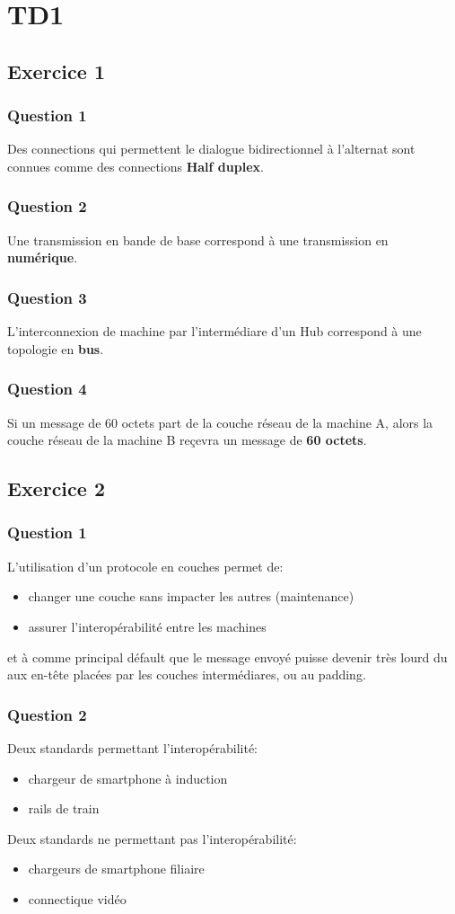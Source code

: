 \section{TD1}

\subsection{Exercice 1}
\subsubsection{Question 1}
Des connections qui permettent le dialogue bidirectionnel à l'alternat sont connues comme des connections \textbf{Half duplex}.
\subsubsection{Question 2}
Une transmission en bande de base correspond à une transmission en \textbf{numérique}.
\subsubsection{Question 3}
L'interconnexion de machine par l'intermédiare d'un Hub correspond à une topologie en \textbf{bus}.
\subsubsection{Question 4}
Si un message de 60 octets part de la couche réseau de la machine A, alors la couche réseau de la machine B reçevra un message de \textbf{60 octets}.

\subsection{Exercice 2}
\subsubsection{Question 1}
L'utilisation d'un protocole en couches permet de:
\begin{itemize}
	\item changer une couche sans impacter les autres (maintenance)
	\item assurer l'interopérabilité entre les machines
\end{itemize}
et à comme principal défault que le message envoyé puisse devenir très lourd du aux en-tête placées par les couches intermédiares, ou au padding.
\subsubsection{Question 2}
Deux standards permettant l'interopérabilité:
\begin{itemize}
	\item chargeur de smartphone à induction
	\item rails de train
\end{itemize}
Deux standards ne permettant pas l'interopérabilité:
\begin{itemize}
	\item chargeurs de smartphone filiaire
	\item connectique vidéo
\end{itemize}
